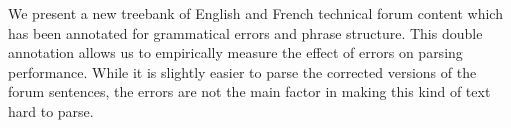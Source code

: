 We present a new treebank of English and French technical forum content which has been annotated for grammatical errors and phrase structure. This double annotation allows us to empirically measure the effect of errors on parsing performance. While it is slightly easier to parse the corrected versions of the forum sentences, the errors are not the main factor in making this kind of text hard to parse.
